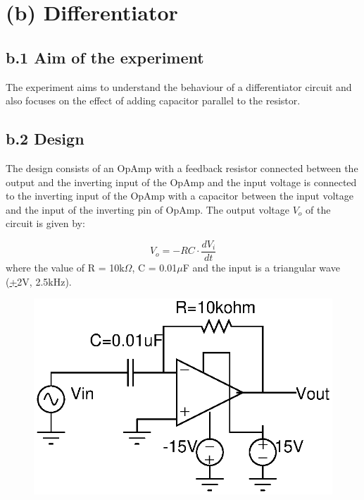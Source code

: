 \documentclass[12pt]{article}
\begin{document}
\section*{(b) Differentiator}

\subsection*{b.1 Aim of the experiment}
The experiment aims to understand the behaviour of a differentiator circuit and also focuses on the effect of adding capacitor parallel to the resistor.

\subsection*{b.2 Design}
The design consists of an OpAmp with a feedback resistor connected between the output and the inverting input of the OpAmp and the input voltage is connected to the inverting input of the OpAmp with a capacitor between the input voltage and the input of the inverting pin of OpAmp. The output voltage $V_{o}$ of the circuit is given by:

 \begin{equation}
     V_{o} = - {RC} \cdot \frac{dV_{i}}{dt}
 \end{equation}     
 where the value of R = 10k$\Omega$, C = 0.01$\mu$F and the input is a triangular wave (\underline{+}2V, 2.5kHz).
 
\begin{figure}[h!]
\centering
\includegraphics[scale = 1]{Exp_1_b_1.eps}
\end{figure}
\end{document}
